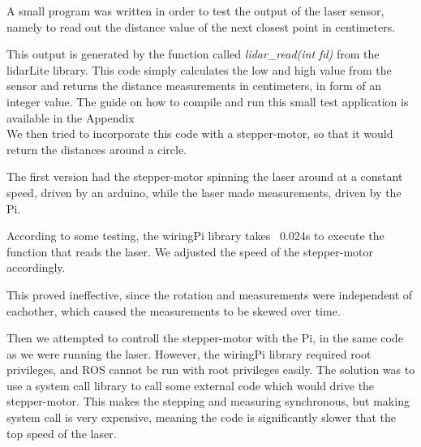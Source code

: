
A small program was written in order to test the output of the laser sensor, namely to read out the distance value of the next closest point in centimeters. 


This output is generated by the function called \textit{lidar\_read(int fd)} from the lidarLite library. This code simply calculates the low and high value from the sensor and returns the distance measurements in centimeters, in form of an integer value. The guide on how to compile and run this small test application is available in the Appendix \\ %



We then tried to incorporate this code with a stepper-motor, so that it would return the distances around a circle.

The first version had the stepper-motor spinning the laser around at a constant speed, driven by an arduino, while the laser made measurements, driven by the Pi.

According to some testing, the wiringPi library takes ~0.024s to execute the function that reads the laser. We adjusted the speed of the stepper-motor accordingly.


This proved ineffective, since the rotation and measurements were independent of eachother, which caused the measurements to be skewed over time.

Then we attempted to controll the stepper-motor with the Pi, in the same code as we were running the laser. However, the wiringPi library required root privileges, and ROS cannot be run with root privileges easily. The solution was to use a system call library to call some external code which would drive the stepper-motor. This makes the stepping and measuring synchronous, but making system call is very expensive, meaning the code is significantly slower that the top speed of the laser.

